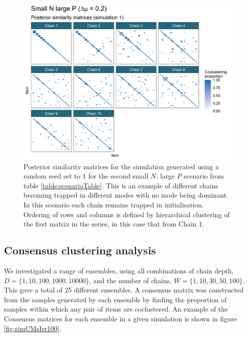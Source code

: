 \documentclass[]{article}
\begin{document}
\begin{figure} %
	\centering
	\includegraphics[scale=0.65]{./Images/Simulations/PSMs/small_n_large_p_small_dmSim1.png}
	\caption{Posterior similarity matrices for the simulation generated using a random seed set to 1 for the second small $N$, large $P$ scenario from table \ref{table:scenarioTable}. This is an example of different chains becoming trapped in different modes with no mode being dominant. In this scenario each chain remains trapped in initialisation. Ordering of rows and columns is defined by hierarchical clustering of the first matrix in the series, in this case that from Chain 1.}
	\label{fig:simPSMsPathologicalDisagreeExample}
\end{figure}

\newpage
\subsection{Consensus clustering analysis} 
We investigated a range of ensembles, using all combinations of chain depth, $D=\{1, 10, 100, 1000, 10000\}$, and the number of chains, $W=\{1, 10, 30, 50, 100\}$. This gave a total of 25 different ensembles. A consensus matrix was constructed from the samples generated by each ensemble by finding the proportion of samples within which any pair of items are coclustered. An example of the Consensus matrices for each ensemble in a given simulation is shown in figure \ref{fig:simCMsIrr100}. 
\end{document}
